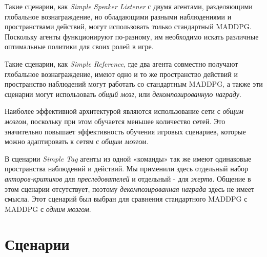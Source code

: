 Такие сценарии, как \textit{Simple Speaker Listener} с двумя агентами, разделяющими глобальное вознаграждение, но обладающими разными наблюдениями и пространствами действий, могут использовать только стандартный MADDPG. Поскольку агенты функционируют по-разному, им необходимо искать различные оптимальные политики для своих ролей в игре.

Такие сценарии, как \textit{Simple Reference}, где два агента совместно получают глобальное вознаграждение, имеют одно и то же пространство действий и пространство наблюдений могут работать со стандартным MADDPG, а также эти сценарии могут использовать \textit{общий мозг}, или \textit{декомпозированную награду}.

Наиболее эффективной архитектурой являются использование сети с \textit{общим мозгом}, поскольку при этом обучается меньшее количество сетей. Это значительно повышает эффективность обучения игровых сценариев, которые можно адаптировать к сетям с \textit{общим мозгом}. 

В сценарии \textit{Simple Tag} агенты из одной «команды» так же имеют одинаковые пространства наблюдений и действий. Мы применили здесь отдельный набор \textit{акторов-критиков} для \textit{преследователей} и отдельный - для \textit{жертв}. Общение в этом сценарии отсутствует, поэтому \textit{декомпозированная награда} здесь не имеет смысла. Этот сценарий был выбран для сравнения стандартного MADDPG с MADDPG с \textit{одним мозгом}.

\newpage

\section{Сценарии}






\newpage
